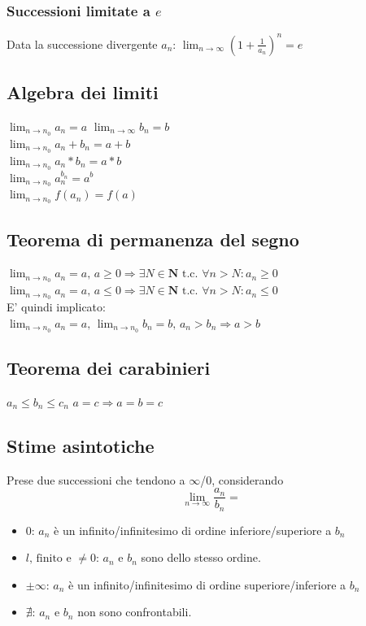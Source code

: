 \documentclass{report}
\begin{document}
        \subsubsection{Successioni limitate a $e$}
            Data la successione divergente $a_n$: $\lim_{n \to \infty} \left(1+\frac{1}{a_n}\right)^n = e$
    \subsection{Algebra dei limiti}
        $\lim_{n \to n_0} a_n = a \, \, \lim_{n \to \infty} b_n = b$ \\
        $\lim_{n \to n_0} a_n + b_n = a + b$ \\
        $\lim_{n \to n_0} a_n * b_n = a * b$ \\
        $\lim_{n \to n_0} a_n^{b_n} = a^b$ \\
        $\lim_{n \to n_0} f(a_n) = f(a)$ \\
    \subsection{Teorema di permanenza del segno}
        $\lim_{n \to n_0} a_n = a, \, a \geq 0 \Longrightarrow \exists N \in \mathbf{N} \textrm{ t.c. }
            \forall n > N: a_n \geq 0$ \\
        $\lim_{n \to n_0} a_n = a, \, a \leq 0 \Longrightarrow \exists N \in \mathbf{N} \textrm{ t.c. }
            \forall n > N: a_n \leq 0$ \\
        E' quindi implicato: \\
        $\lim_{n \to n_0} a_n = a, \, \lim_{n \to n_0} b_n = b, \, a_n > b_n \Longrightarrow a > b$
    \subsection{Teorema dei carabinieri}
        $a_n \leq b_n \leq c_n$
        $a = c \Longrightarrow a = b = c$
    \subsection{Stime asintotiche}
        Prese due successioni che tendono a $\infty$/$0$, considerando 
        $$\lim_{n \to \infty}\frac{a_n}{b_n} = $$
    \begin{itemize}
        \item $0$: $a_n$ è un infinito/infinitesimo di ordine inferiore/superiore a $b_n$
        \item $l, \, \textrm{finito e } \neq 0$: $a_n$ e $b_n$ sono dello stesso ordine. \\
        \item $\pm \infty$: $a_n$ è un infinito/infinitesimo di ordine superiore/inferiore a $b_n$
        \item $\nexists$: $a_n$ e $b_n$ non sono confrontabili.
    \end{itemize}
\end{document}
